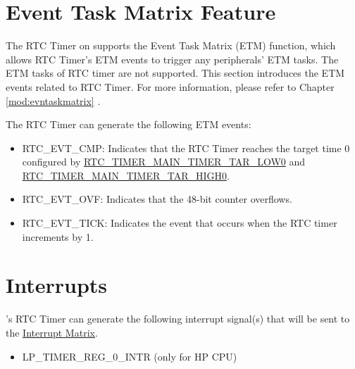 \documentclass[main\_\_EN.tex]{subfiles}
\begin{document}
\begin{itemize}
\begin{itemize}
    \end{itemize}
\end{itemize}



\section{Event Task Matrix Feature}
\label{sec:rtctimer-etm-func}


The RTC Timer on \chipname{} supports the Event Task Matrix (ETM) function, which allows RTC Timer's ETM events to trigger any peripherals' ETM tasks. The ETM tasks of RTC timer are not supported. This section introduces the ETM events related to RTC Timer. For more information, please refer to Chapter \ref{mod:evntaskmatrix} .

The RTC Timer can generate the following ETM events:

\begin{itemize}
    \item RTC\_EVT\_CMP: Indicates that the RTC Timer reaches the target time 0 configured by \hyperref[fielddesc:RTCTIMERMAINTIMERTARLOW0]{RTC\_TIMER\_MAIN\_TIMER\_TAR\_LOW0} and \hyperref[fielddesc:RTCTIMERMAINTIMERTARHIGH0]{RTC\_TIMER\_MAIN\_TIMER\_TAR\_HIGH0}.
    \item RTC\_EVT\_OVF: Indicates that the 48-bit counter overflows.
    \item RTC\_EVT\_TICK: Indicates the event that occurs when the RTC timer increments by 1.
\end{itemize}



\section{Interrupts}

\chipname{}'s RTC Timer can generate the following interrupt signal(s) that will be sent to the \hyperref[mod:intmtrx]{Interrupt Matrix}.

    \begin{itemize}
        \item LP\_TIMER\_REG\_0\_INTR (only for HP CPU)
    \end{itemize}
\end{document}
